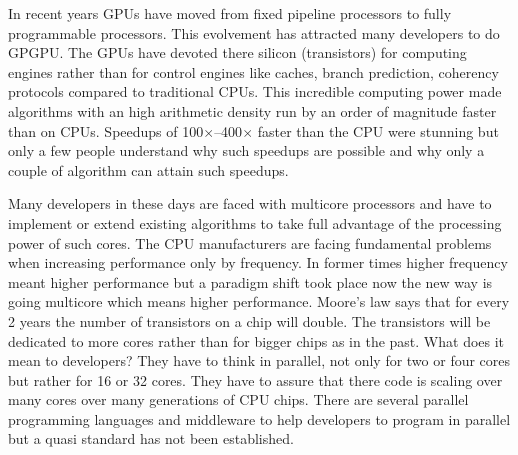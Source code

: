 



In recent years \glspl{GPU} have moved from fixed pipeline processors to fully
programmable processors. This evolvement has attracted many developers to do
\gls{GPGPU}. The \glspl{GPU} have devoted there silicon (transistors) for
computing engines rather than for control engines like caches, branch
prediction, coherency protocols compared to traditional \glspl{CPU}. This
incredible computing power made algorithms with an high arithmetic density run
by an order of magnitude faster than on \glspl{CPU}. Speedups of 
100$\times$--400$\times$ faster than the \gls{CPU} were stunning but only a few
people understand why such speedups are possible and why only a couple of
algorithm can attain such speedups.


Many developers in these days are faced with multicore processors and have to
implement or extend existing algorithms to take full advantage of the processing
power of such cores. The \gls{CPU} manufacturers are facing fundamental problems
when increasing performance only by frequency. In former times higher frequency
meant higher performance but a paradigm shift took place now the new way is
going multicore which means higher performance. Moore's law says that for every
2 years the number of transistors on a chip will double. The transistors will be
dedicated to more cores rather than for bigger chips as in the past. What does
it mean to developers? They have to think in parallel, not only for two or four
cores but rather for 16 or 32 cores. They have to assure that there code is
scaling over many cores over many generations of \gls{CPU} chips. There are
several parallel programming languages and middleware to help developers to
program in parallel but a quasi standard has not been established. 


